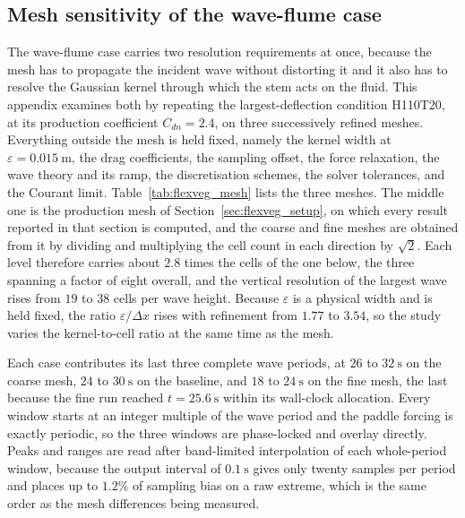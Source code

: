 \begin{appendices}
\section{Mesh sensitivity of the wave-flume case}
\label{app:flexveg_mesh}

\noindent
The wave-flume case carries two resolution requirements at once, because the mesh has to propagate the incident wave without distorting it and it also has to resolve the Gaussian kernel through which the stem acts on the fluid. This appendix examines both by repeating the largest-deflection condition H110T20, at its production coefficient $C_{dn} = 2.4$, on three successively refined meshes. Everything outside the mesh is held fixed, namely the kernel width at $\varepsilon = 0.015~\mathrm{m}$, the drag coefficients, the sampling offset, the force relaxation, the wave theory and its ramp, the discretisation schemes, the solver tolerances, and the Courant limit. Table~\ref{tab:flexveg_mesh} lists the three meshes. The middle one is the production mesh of Section~\ref{sec:flexveg_setup}, on which every result reported in that section is computed, and the coarse and fine meshes are obtained from it by dividing and multiplying the cell count in each direction by $\sqrt{2}$. Each level therefore carries about $2.8$ times the cells of the one below, the three spanning a factor of eight overall, and the vertical resolution of the largest wave rises from $19$ to $38$ cells per wave height. Because $\varepsilon$ is a physical width and is held fixed, the ratio $\varepsilon/\Delta x$ rises with refinement from $1.77$ to $3.54$, so the study varies the kernel-to-cell ratio at the same time as the mesh.

\noindent
Each case contributes its last three complete wave periods, at $26$ to $32~\mathrm{s}$ on the coarse mesh, $24$ to $30~\mathrm{s}$ on the baseline, and $18$ to $24~\mathrm{s}$ on the fine mesh, the last because the fine run reached $t = 25.6~\mathrm{s}$ within its wall-clock allocation. Every window starts at an integer multiple of the wave period and the paddle forcing is exactly periodic, so the three windows are phase-locked and overlay directly. Peaks and ranges are read after band-limited interpolation of each whole-period window, because the output interval of $0.1~\mathrm{s}$ gives only twenty samples per period and places up to $1.2\%$ of sampling bias on a raw extreme, which is the same order as the mesh differences being measured.


\end{appendices}

